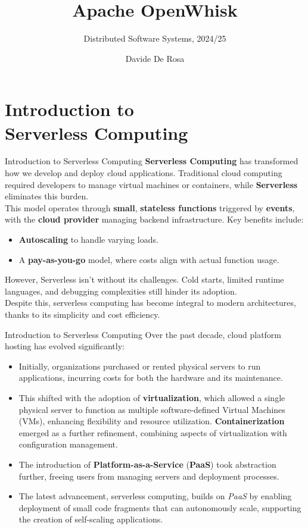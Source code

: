 \documentclass[aspectratio=169]{beamer}
\title{Apache OpenWhisk}
\subtitle{Distributed Software Systems, 2024/25}
\author{Davide De Rosa}
\date{}
\begin{document}
\begin{frame}[plain]
    \titlepage
\end{frame}

\section{Introduction to \\Serverless Computing}
\begin{frame}{Introduction to Serverless Computing}
\textbf{Serverless Computing} has transformed how we develop and deploy cloud applications. Traditional cloud computing required developers to manage virtual machines or containers, while \textbf{Serverless} eliminates this burden.\\
This model operates through \textbf{small}, \textbf{stateless functions} triggered by \textbf{events}, with the \textbf{cloud provider} managing backend infrastructure. Key benefits include:
\begin{itemize}
    \item \textbf{Autoscaling} to handle varying loads.
    \item A \textbf{pay-as-you-go} model, where costs align with actual function usage.
\end{itemize}
However, Serverless isn’t without its challenges. Cold starts, limited runtime languages, and debugging complexities still hinder its adoption.\\
Despite this, serverless computing has become integral to modern architectures, thanks to its simplicity and cost efficiency.
\end{frame}

\begin{frame}{Introduction to Serverless Computing}
Over the past decade, cloud platform hosting has evolved significantly:
\begin{itemize}
    \item Initially, organizations purchased or rented physical servers to run applications, incurring costs for both the hardware and its maintenance.
    \item This shifted with the adoption of \textbf{virtualization}, which allowed a single physical server to function as multiple software-defined Virtual Machines (VMs), enhancing flexibility and resource utilization. \textbf{Containerization} emerged as a further refinement, combining aspects of virtualization with configuration management.
    \item The introduction of \textbf{Platform-as-a-Service} (\textbf{PaaS}) took abstraction further, freeing users from managing servers and deployment processes.
    \item The latest advancement, serverless computing, builds on \textit{PaaS} by enabling deployment of small code fragments that can autonomously scale, supporting the creation of self-scaling applications.
\end{itemize}
\end{frame}
\end{document}
